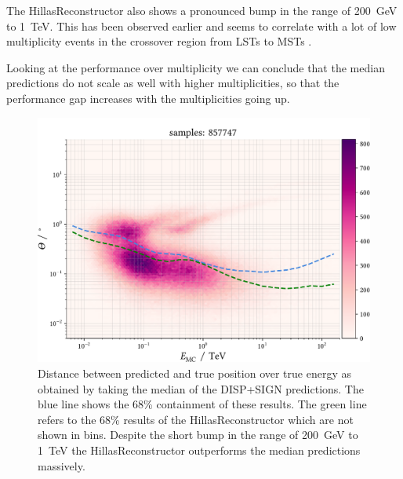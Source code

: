 The HillasReconstructor also shows a pronounced bump in the range of \SI{200}{\giga\electronvolt}
to \SI{1}{\tera\electronvolt}. 
This has been observed earlier and seems to correlate with 
a lot of low multiplicity events in the crossover region from LSTs to MSTs \cite{kai? max?}.

Looking at the performance over multiplicity we can conclude that the median predictions
do not scale as well with higher multiplicities, so that the performance gap increases with
the multiplicities going up.

\begin{figure}
    \centering
    \captionsetup{width=0.9\linewidth}
    \includegraphics[width=0.9\linewidth]{../analysis/plots/gamma/median_vs_energy.pdf} 
    \caption{Distance between predicted and true position over true energy as obtained by taking the median of
    the DISP+SIGN predictions. The blue line shows the 
    68\% containment of these results. The green line refers to the 68\%
    results of the HillasReconstructor which are not shown in bins.
    Despite the short bump in the range of \SI{200}{\giga\electronvolt}
    to \SI{1}{\tera\electronvolt} the HillasReconstructor outperforms the median predictions
    massively.}
    \label{fig:stereo_median_energy}
\end{figure}

